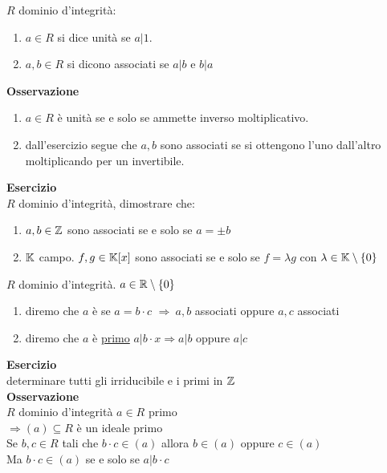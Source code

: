 \documentclass[12px]{article}
\begin{document}
	  \begin{defi}
	  	$R$ dominio d'integrità:
		\begin{enumerate}
			\item $a\in R$ si dice unità se  $a | 1$.
			\item  $a,b\in R$ si dicono associati se  $a|b$ e $b|a$
		\end{enumerate}
	  \end{defi}
	  \textbf{Osservazione}
	  \begin{enumerate}
		  \item $a\in R$ è unità se e solo se ammette inverso moltiplicativo.
		  \item dall'esercizio segue che $a,b$ sono associati se si ottengono l'uno dall'altro moltiplicando per un invertibile.
	  \end{enumerate}
	  \textbf{Esercizio}\\
	  $R$ dominio d'integrità, dimostrare che:
	  \begin{enumerate}
		  \item $a,b\in\mathbb{Z}$ sono associati se e solo se  $a = \pm b$
		  \item  $\mathbb{K}$ campo. $f,g\in \mathbb{K}[x]$ sono associati se e solo se  $f = \lambda g$ con $\lambda\in\mathbb{K}\setminus\{0\}$
	  \end{enumerate}
	  \begin{defi}
		  $R$ dominio d'integrità. $a\in\mathbb{R}\setminus\{0\}$\\
		   \begin{enumerate}
			   \item diremo che $a$ è  se $a = b\cdot c$  $ \Rightarrow \ a,b$ associati oppure $a,c$ associati
			   \item diremo che $a$ è \underline{primo} $a | b\cdot x \Rightarrow a | b$ oppure $a|c$
		  \end{enumerate}
	  \end{defi}
	  \textbf{Esercizio}\\
	  determinare tutti gli irriducibile e i primi in $\mathbb{Z}$ \\
	 \textbf{Osservazione}\\
	 $R$ dominio d'integrità  $a\in R$ primo\\
	  $ \Rightarrow (a)\subseteq R$ è un ideale primo\\
	  Se $b,c\in R$ tali che  $b\cdot c\in (a)$ allora  $b\in (a)$ oppure  $c\in (a)$\\
	  Ma  $b\cdot c \in (a)$ se e solo se $a | b\cdot c$\\
\end{document}
